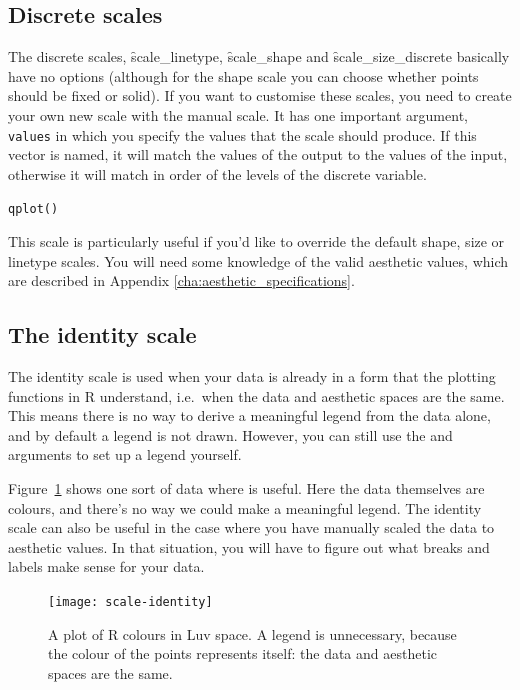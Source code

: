 \subsection{Discrete scales}
\label{sub:scale-discrete}

The discrete scales, \f{scale_linetype}, \f{scale_shape} and \f{scale_size_discrete} basically have no options (although for the shape scale you can choose whether points should be fixed or solid).  If you want to customise these scales, you need to create your own new scale with the manual scale.  It has one important argument, \verb|values| in which you specify the values that the scale should produce.  If this vector is named, it will match the values of the output to the values of the input, otherwise it will match in order of the levels of the discrete variable.  

\begin{alltt}
qplot()
\end{alltt}

This scale is particularly useful if you'd like to override the default shape, size or linetype scales.  You will need some knowledge of the valid aesthetic values, which are described in Appendix \ref{cha:aesthetic_specifications}.

\subsection{The identity scale}
\label{sub:scale-identity}

The identity scale is used when your data is already in a form that the plotting functions in R understand, i.e.\ when the data and aesthetic spaces are the same.  This means there is no way to derive a meaningful legend from the data alone, and by default a legend is not drawn.  However, you can still use the  and  arguments to set up a legend yourself.

Figure~\ref{fig:scale-identity} shows one sort of data where  is useful.  Here the data themselves are colours, and there's no way we could make a meaningful legend.  The identity scale can also be useful in the case where you have manually scaled the data to aesthetic values.  In that situation, you will have to figure out what breaks and labels make sense for your data.

\begin{figure}[htbp]
  \centering
    \texttt{[image: scale-identity]}
  \caption{A plot of R colours in Luv space.  A legend is unnecessary, because the colour of the points represents itself: the data and aesthetic spaces are the same.}
  \label{fig:scale-identity}
\end{figure}

